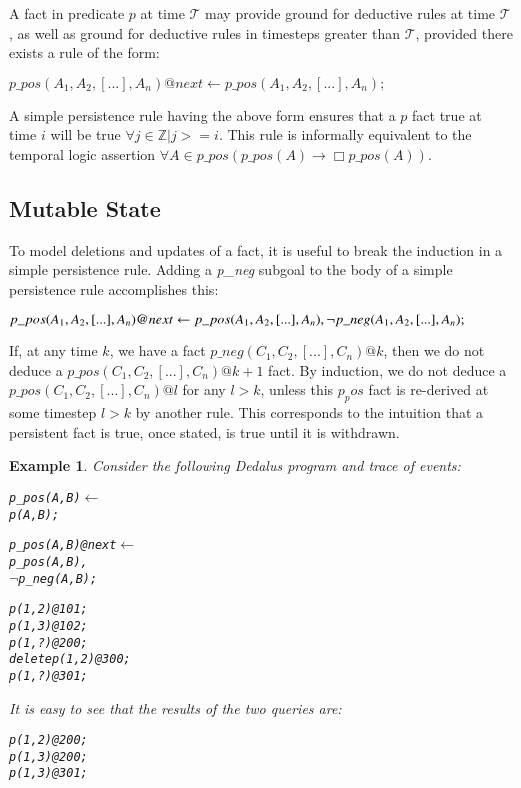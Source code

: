 \documentclass{acm_proc_article-sp-sigmod09}
\newcommand{\Tau}{\mathcal{T}}
\newenvironment{Dedalus}{
\vspace{0.5em}\begin{minipage}{0.95\textwidth}%
\begin{alltt}\fontsize{9pt}{9pt}\selectfont}
{\end{alltt}\end{minipage}\vspace{0.5em}}
\begin{document}
A fact in predicate $p$ at time $\Tau$ may provide ground for deductive rules
at time $\Tau$, as well as ground for deductive rules in timesteps greater than $\Tau$,
provided there exists a rule of the form:

$p\_pos(A_1,A_2,[...],A_n)@next \leftarrow 
p\_pos(A_1,A_2,[...],A_n);$


A simple persistence rule having the above form ensures that a $p$ fact true at time $i$ will be true
$\forall j \in \mathbb{Z} | j >= i$.  This rule is informally equivalent to the temporal logic assertion
$\forall A \in p\_pos( p\_pos(A) \to \Box p\_pos(A))$.

\subsection{Mutable State}

To model deletions and updates of a fact, it is useful to break the induction
in a simple persistence rule.  Adding a {\em p\_neg} subgoal to the body of a
simple persistence rule accomplishes this:

$p\_pos(A_1,A_2,[...],A_n)@next \leftarrow \\
p\_pos(A_1,A_2,[...],A_n), \\
\lnot p\_neg(A_1,A_2,[...],A_n);
$

%
%

If, at any time $k$, we have a fact $p\_neg(C_1,C_2,[...],C_n)@k$, then we do
not deduce a $p\_pos(C_1,C_2,[...],C_n)@k+1$ fact.  By induction, we do not
deduce a $p\_pos(C_1,C_2,[...],C_n)@l$ for any $l > k$, unless this $p_pos$
fact is re-derived at some timestep $l > k$ by another rule.  This corresponds to 
the intuition that a persistent fact is true, once stated, is true until it is withdrawn.  

\newtheorem{example}{Example}
\begin{example}
Consider the following Dedalus program and {\em trace} of events:

\begin{Dedalus}
p_pos(A, B) \(\leftarrow\)
  p(A, B);

p_pos(A, B)@next \(\leftarrow\) 
  p_pos(A, B),
  \(\lnot\) p_neg(A, B);

p(1,2)@101;
p(1,3)@102;
p(1,?)@200;
delete p(1,2)@300;
p(1,?)@301;
\end{Dedalus}

It is easy to see that the results of the two queries are:


\begin{Dedalus}
p(1,2)@200;
p(1,3)@200;
p(1,3)@301;
\end{Dedalus}

\end{example}
\end{document}
